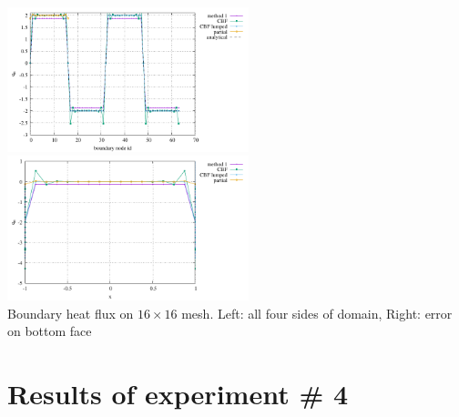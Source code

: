 \begin{center}
\includegraphics[width=7cm]{python_codes/fieldstone_173/results/exp3/heat_flux_boundary.pdf}
\includegraphics[width=7cm]{python_codes/fieldstone_173/results/exp3/heat_flux_boundary_bottom.pdf}\\
{\captionfont Boundary heat flux on $16 \times 16$ mesh. Left: all four 
sides of domain, Right: error on bottom face}
\end{center}

\newpage
\section*{Results of experiment \# 4}

